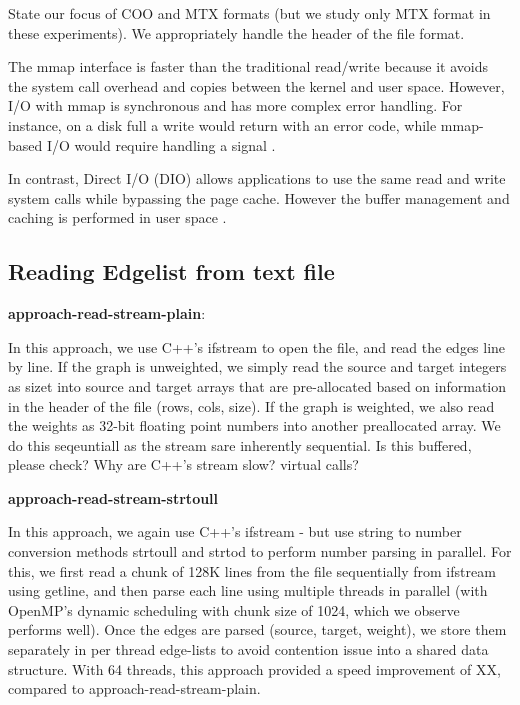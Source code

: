 State our focus of COO and MTX formats (but we study only MTX format in these experiments).
We appropriately handle the header of the file format.

The mmap interface is faster than the traditional read/write because it avoids the system call overhead and copies between the kernel and user space. However, I/O with mmap is synchronous and has more complex error handling. For instance, on a disk full a write would return with an error code, while mmap-based I/O would require handling a signal \cite{enberg2022transcending}.

In contrast, Direct I/O (DIO) allows applications to use the same read and write system calls while bypassing the page cache. However the buffer management and caching is performed in user space \cite{enberg2022transcending}.




\subsection{Reading Edgelist from text file}

\textbf{approach-read-stream-plain}:

In this approach, we use C++'s ifstream to open the file, and read the edges line by line. If the graph is unweighted, we simply read the source and target integers as sizet into source and target arrays that are pre-allocated based on information in the header of the file (rows, cols, size). If the graph is weighted, we also read the weights as 32-bit floating point numbers into another preallocated array. We do this seqeuntiall as the stream sare inherently sequential. Is this buffered, please check? Why are C++'s stream slow? virtual calls?

\textbf{approach-read-stream-strtoull}

In this approach, we again use C++'s ifstream - but use string to number conversion methods strtoull and strtod to perform number parsing in parallel. For this, we first read a chunk of 128K lines from the file sequentially from ifstream using getline, and then parse each line using multiple threads in parallel (with OpenMP's dynamic scheduling with chunk size of 1024, which we observe performs well). Once the edges are parsed (source, target, weight), we store them separately in per thread edge-lists to avoid contention issue into a shared data structure. With 64 threads, this approach provided a speed improvement of XX, compared to approach-read-stream-plain.

